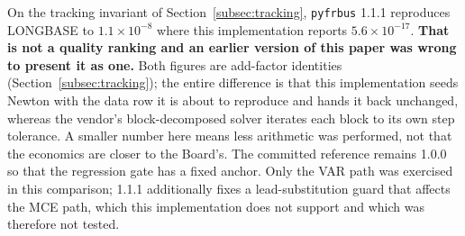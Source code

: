 On the tracking invariant of Section~\ref{subsec:tracking}, \texttt{pyfrbus} 1.1.1 reproduces LONGBASE to $1.1\times10^{-8}$ where this implementation reports $5.6\times10^{-17}$. \textbf{That is not a quality ranking and an earlier version of this paper was wrong to present it as one.} Both figures are add-factor identities (Section~\ref{subsec:tracking}); the entire difference is that this implementation seeds Newton with the data row it is about to reproduce and hands it back unchanged, whereas the vendor's block-decomposed solver iterates each block to its own step tolerance. A smaller number here means less arithmetic was performed, not that the economics are closer to the Board's. The committed reference remains 1.0.0 so that the regression gate has a fixed anchor. Only the VAR path was exercised in this comparison; 1.1.1 additionally fixes a lead-substitution guard that affects the MCE path, which this implementation does not support and which was therefore not tested.
